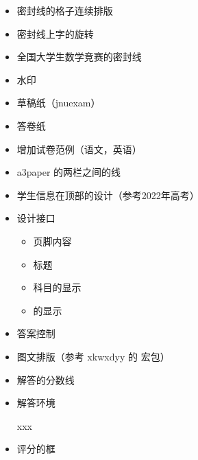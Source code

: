 \documentclass{ccnudoc}
\begin{document}
\begin{itemize}
  \item 密封线的格子连续排版
  \item 密封线上字的旋转
  \item 全国大学生数学竞赛的密封线
  \item 水印
  \item 草稿纸（jnuexam）
  \item 答卷纸
  \item 增加试卷范例（语文，英语）
  \item a3paper 的两栏之间的线
    \begin{latexexample}[gobble = 6]
      \setlength{\columnseprule}{0.4pt}
    \end{latexexample}
  \item 学生信息在顶部的设计（参考2022年高考）
  \item 设计接口
    \begin{itemize}
      \item 页脚内容
      \item 标题
      \item 科目的显示
      \item {} 的显示
    \end{itemize}
  \item 答案控制
  \item 图文排版（参考 xkwxdyy 的  宏包）
  \item 解答的分数线
  \item 解答环境
    \begin{latexexample}[gobble = 6]
      \begin{solution}
        xxx
      \end{solution}

    \end{latexexample}
  \item 评分的框
\end{itemize}

\end{document}
